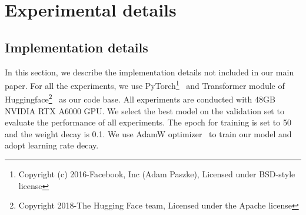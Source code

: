 \section{Experimental details}
\label{supp:exp_details}


\subsection{Implementation details}
In this section, we describe the implementation details not included in our main paper.
For all the experiments, we use PyTorch\footnote{Copyright (c) 2016-Facebook, Inc (Adam Paszke), Licensed under BSD-style license}~\cite{paszke2019pytorch} and Transformer module of Huggingface\footnote{Copyright 2018-The Hugging Face team, Licensed under the Apache license}~\cite{wolf2019huggingface} as our code base.
All experiments are conducted with 48GB NVIDIA RTX A6000 GPU.
We select the best model on the validation set to evaluate the performance of all experiments.
The epoch for training is set to 50 and the weight decay is 0.1. 
We use AdamW optimizer~\cite{Loshchilov2019adamw} to train our model and adopt learning rate decay.
